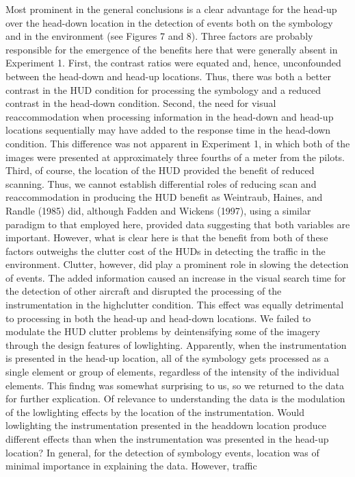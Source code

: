 \documentclass[utf8,bachelor,manualbib]{gradu3}
\begin{document}
Most prominent in the general conclusions is a clear advantage for the head-up over
the head-down location in the detection of events both on the symbology and in the
environment (see Figures 7 and 8). Three factors are probably responsible for the
emergence of the benefits here that were generally absent in Experiment 1. First,
the contrast ratios were equated and, hence, unconfounded between the head-down
and head-up locations. Thus, there was both a better contrast in the HUD condition
for processing the symbology and a reduced contrast in the head-down condition.
Second, the need for visual reaccommodation when processing information in the
head-down and head-up locations sequentially may have added to the response time
in the head-down condition. This difference was not apparent in Experiment 1, in which both of the images were presented at approximately three fourths of a meter
from the pilots. Third, of course, the location of the HUD provided the benefit of
reduced scanning. Thus, we cannot establish differential roles of reducing scan and
reaccommodation in producing the HUD benefit as Weintraub, Haines, and Randle
(1985) did, although Fadden and Wickens (1997), using a similar paradigm to that
employed here, provided data suggesting that both variables are important. However,
what is clear here is that the benefit from both of these factors outweighs the
clutter cost of the HUDs in detecting the traffic in the environment.
Clutter, however, did play a prominent role in slowing the detection of events.
The added information caused an increase in the visual search time for the detection
of other aircraft and disrupted the processing of the instrumentation in the highclutter
condition. This effect was equally detrimental to processing in both the
head-up and head-down locations. We failed to modulate the HUD clutter problems
by deintensifying some of the imagery through the design features of lowlighting.
Apparently, when the instrumentation is presented in the head-up location, all of
the symbology gets processed as a single element or group of elements, regardless
of the intensity of the individual elements. This findng was somewhat surprising
to us, so we returned to the data for further explication. Of relevance to understanding
the data is the modulation of the lowlighting effects by the location of the
instrumentation. Would lowlighting the instrumentation presented in the headdown
location produce different effects than when the instrumentation was presented
in the head-up location? In general, for the detection of symbology events,
location was of minimal importance in explaining the data. However, traffic
\end{document}

